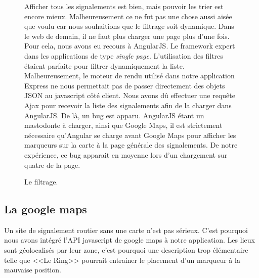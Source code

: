 \documentclass[a4paper,11pt]{article}
\begin{document}
\begin{figure}[!h]
   	\begin{minipage}{0.6\linewidth}
\parindent 5mm Afficher tous les signalements est bien, mais pouvoir les trier est encore mieux. Malheureusement ce ne fut pas une chose aussi aisée que voulu car nous souhaitions que le filtrage soit dynamique. Dans le web de demain, il ne faut plus charger une page plus d'une fois. Pour cela, nous avons eu recours à \textsf{AngularJS}. Le framework expert dans les applications de type \textit{single page}. L'utilisation des filtres étaient parfaite pour filtrer dynamiquement la liste. Malheureusement, le moteur de rendu utilisé dans notre application Express ne nous permettait pas de passer directement des objets JSON au javascript côté client. Nous avons dû effectuer une requête Ajax pour recevoir la liste des signalements afin de la charger dans AngularJS. De là, un bug est apparu. AngularJS étant un mastodonte à charger, ainsi que Google Maps, il est strictement nécessaire qu'Angular se charge avant Google Maps pour afficher les marqueurs sur la carte à la page générale des signalements. De notre expérience, ce bug apparait en moyenne lors d’un chargement sur quatre de la page.
   	\end{minipage}
   	\begin{minipage}{0.4\linewidth}   
   		\centering
		\caption{Le filtrage.}
   	\end{minipage}  
\end{figure}

\subsection{La google maps}

Un site de signalement routier sans une carte n'est pas sérieux. C'est pourquoi nous avons intégré l'API javascript de google maps à notre application. Les lieux sont géolocalisés par leur zone, c'est pourquoi une description trop élémentaire telle que <<Le Ring>> pourrait entrainer le placement d'un marqueur à la mauvaise position.
\end{document}

